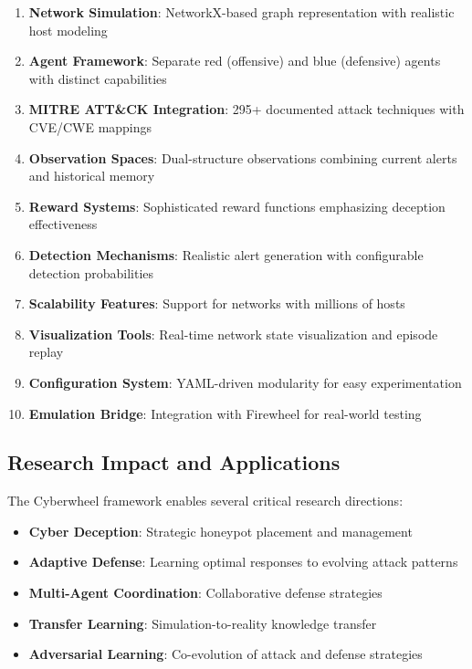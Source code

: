 \documentclass[12pt,a4paper]{article}
\begin{document}
\begin{enumerate}
    \item \textbf{Network Simulation}: NetworkX-based graph representation with realistic host modeling
    \item \textbf{Agent Framework}: Separate red (offensive) and blue (defensive) agents with distinct capabilities
    \item \textbf{MITRE ATT\&CK Integration}: 295+ documented attack techniques with CVE/CWE mappings
    \item \textbf{Observation Spaces}: Dual-structure observations combining current alerts and historical memory
    \item \textbf{Reward Systems}: Sophisticated reward functions emphasizing deception effectiveness
    \item \textbf{Detection Mechanisms}: Realistic alert generation with configurable detection probabilities
    \item \textbf{Scalability Features}: Support for networks with millions of hosts
    \item \textbf{Visualization Tools}: Real-time network state visualization and episode replay
    \item \textbf{Configuration System}: YAML-driven modularity for easy experimentation
    \item \textbf{Emulation Bridge}: Integration with Firewheel for real-world testing
\end{enumerate}

\subsection{Research Impact and Applications}
The Cyberwheel framework enables several critical research directions:

\begin{itemize}
    \item \textbf{Cyber Deception}: Strategic honeypot placement and management
    \item \textbf{Adaptive Defense}: Learning optimal responses to evolving attack patterns  
    \item \textbf{Multi-Agent Coordination}: Collaborative defense strategies
    \item \textbf{Transfer Learning}: Simulation-to-reality knowledge transfer
    \item \textbf{Adversarial Learning}: Co-evolution of attack and defense strategies
\end{itemize}
\end{document}

